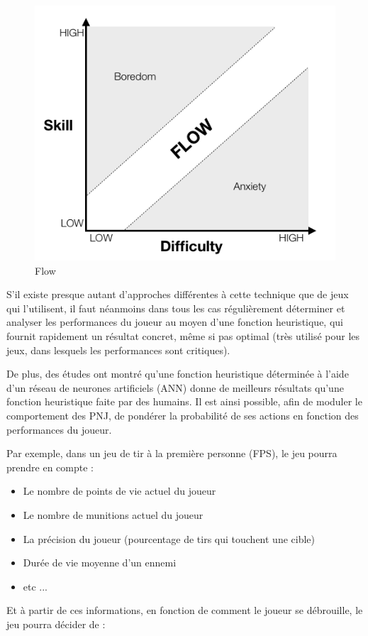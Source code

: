 \documentclass[a4paper, 12pt]{article} %
\begin{document}
\begin{figure}[!h]%
	\begin{center} 
		\includegraphics[width=0.60\columnwidth]{images/flow.png}%
		\caption{Flow}%
	\end{center}
\end{figure}

S’il existe presque autant d’approches différentes à cette technique que de jeux qui l’utilisent, il faut néanmoins dans tous les cas régulièrement déterminer et analyser les performances du joueur au moyen d’une fonction heuristique, qui fournit rapidement un résultat concret, même si pas optimal (très utilisé pour les jeux, dans lesquels les performances sont critiques).

De plus, des études ont montré qu’une fonction heuristique déterminée à l’aide d’un réseau de neurones artificiels (ANN) donne de meilleurs résultats qu’une fonction heuristique faite par des humains.
Il est ainsi possible, afin de moduler le comportement des PNJ, de pondérer la probabilité de ses actions en fonction des performances du joueur.

Par exemple, dans un jeu de tir à la première personne (FPS), le jeu pourra prendre en compte :

\begin{itemize}
	\item Le nombre de points de vie actuel du joueur
	\item Le nombre de munitions actuel du joueur
	\item La précision du joueur (pourcentage de tirs qui touchent une cible)
	\item Durée de vie moyenne d’un ennemi
	\item etc ...
\end{itemize}

Et à partir de ces informations, en fonction de comment le joueur se débrouille, le jeu pourra décider de :
\end{document}
